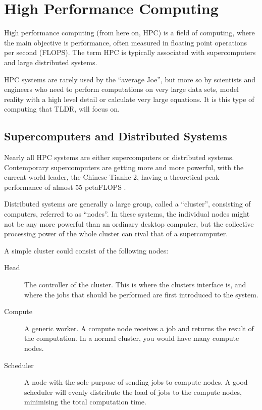 \section{High Performance Computing}

High performance computing (from here on, HPC) is a field of computing, where the main objective is performance, often measured in floating point operations per second (FLOPS). The term HPC is typically associated with supercomputers and large distributed systems. 

HPC systems are rarely used by the \enquote{average Joe}, but more so by scientists and engineers who need to perform computations on very large data sets, model reality with a high level detail or calculate very large equations. It is this type of computing that TLDR, will focus on.


\subsection{Supercomputers and Distributed Systems}

Nearly all HPC systems are either supercomputers or distributed systems. Contemporary supercomputers are getting more and more powerful, with the current world leader, the Chinese Tianhe-2, having a theoretical peak performance of almost 55 petaFLOPS \cite{top500}.

Distributed systems are generally a large group, called a \enquote{cluster}, consisting of computers, referred to as \enquote{nodes}. In these systems, the individual nodes might not be any more powerful than an ordinary desktop computer, but the collective processing power of the whole cluster can rival that of a supercomputer.

A simple cluster could consist of the following nodes:
\begin{description}
	\item [Head]
	The controller of the cluster. This is where the clusters interface is, and where the jobs that should be performed are first introduced to the system.
	\item [Compute]
	A generic worker. A compute node receives a job and returns the result of the computation. In a normal cluster, you would have many compute nodes.
	\item [Scheduler]
	A node with the sole purpose of sending jobs to compute nodes. A good scheduler will evenly distribute the load of jobs to the compute nodes, minimising the total computation time.
\end{description}


